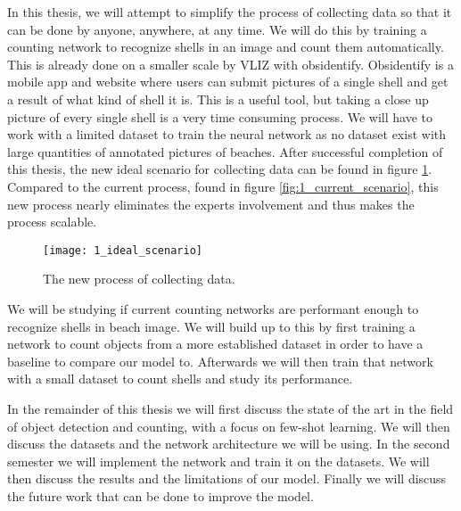 In this thesis, we will attempt to simplify the process of collecting data so that it can be done by anyone, anywhere, at any time. We will do this by training a counting network to recognize shells in an image and count them automatically. This is already done on a smaller scale by VLIZ with obsidentify. Obsidentify is a mobile app and website where users can submit pictures of a single shell and get a result of what kind of shell it is. This is a useful tool, but taking a close up picture of every single shell is a very time consuming process. We will have to work with a limited dataset to train the neural network as no dataset exist with large quantities of annotated pictures of beaches. After successful completion of this thesis, the new ideal scenario for collecting data can be found in figure \ref{fig:1_ideal_scenario}. Compared to the current process, found in figure \ref{fig:1_current_scenario}, this new process nearly eliminates the experts involvement and thus makes the process scalable.

\begin{figure}[h]
	\centering
	\texttt{[image: 1\_ideal\_scenario]}
	\caption{The new process of collecting data.}
	\label{fig:1_ideal_scenario}
\end{figure}

We will be studying if current counting networks are performant enough to recognize shells in beach image. We will build up to this by first training a network to count objects from a more established dataset in order to have a baseline to compare our model to. Afterwards we will then train that network with a small dataset to count shells and study its performance.

In the remainder of this thesis we will first discuss the state of the art in the field of object detection and counting, with a focus on few-shot learning. We will then discuss the datasets and the network architecture we will be using. In the second semester we will implement the network and train it on the datasets. We will then discuss the results and the limitations of our model. Finally we will discuss the future work that can be done to improve the model.